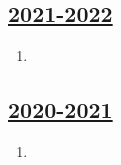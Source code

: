 \subsection[2021-2022]{\hyperref[sec:kr_02_2021_2022]{2021-2022}}
\label{sec:sol_kr_02_2021_2022} %



\begin{enumerate}

\item 


\end{enumerate}
    

\subsection[2020-2021]{\hyperref[sec:kr_02_2020_2021]{2020-2021}}
\label{sec:sol_kr_02_2020_2021} %



\begin{enumerate}
    
    
    
    \item
 
 
\end{enumerate}


